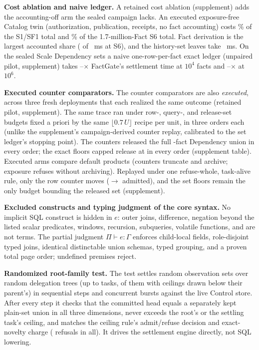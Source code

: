 \documentclass[journal,onecolumn]{IEEEtran}
\newcommand{\code}[1]{\texttt{\detokenize{#1}}}
\begin{document}
\textbf{Cost ablation and naive ledger.} A retained cost
ablation (supplement) adds the accounting-off arm the sealed campaign lacks. An executed exposure-free Catalog
twin (authorization, publication, receipts, no fact accounting) costs
\BFiveSOneCommonPct\% of the S1/SF1 total and \BFiveSSixCommonPct\% of the
1.7-million-Fact S6 total. Fact derivation is the largest accounted share
(\BFiveSSixDerivation{} of \BFiveSSixArmIV{}~ms at S6), and the history-set
leaves take \BFiveSSixLedger{}~ms. On the sealed Scale Dependency sets a naive one-row-per-fact
exact ledger (unpaired pilot, supplement) takes
\NaiveScaleTenKFullRatio{}--\NaiveScaleTenKZeroRatio{}$\times$ FactGate's settlement time at $10^4$
facts and \NaiveScaleMillionFullRatio{}--\NaiveScaleMillionZeroRatio{}$\times$ at $10^6$.

\textbf{Executed counter comparators.} The counter comparators are also \emph{executed}, across three fresh
deployments that each realized the same outcome (retained pilot,
supplement). The same trace ran under row-, query-, and release-set budgets
fixed a priori by the same $\lfloor 0.7\,U\rfloor$ recipe per unit, in
three orders each (unlike the supplement's campaign-derived counter replay,
calibrated to the set ledger's stopping point). The counters
released the full \FinalVFiveCounterNaiveMinDep{}-fact Dependency union in
every order; the exact floors capped release at
\FinalVFiveCounterExactMaxDep{} in every order (supplement table). Executed arms compare default products
(counters truncate and archive; exposure refuses without archiving).
Replayed under one refuse-whole, task-alive rule, only the row counter
moves (\AlignedRowsNaturalExecuted{}$\to$\AlignedRowsNaturalAdmitted{}
admitted), and the set floors remain the only budget bounding the released
set (supplement).

\textbf{Excluded constructs and typing judgment of the core syntax.}
No implicit SQL construct is hidden in $e$: outer joins, difference,
negation beyond the listed scalar predicates, windows, recursion,
subqueries, volatile functions, and \code{UNION ALL} are not terms. The
partial judgment $\Pi\vdash e:\Gamma$ enforces child-local fields,
role-disjoint typed joins, identical distinctable union schemas, typed
grouping, and a proven total page order; undefined premises reject.

\textbf{Randomized root-family test.} The test settles
\VFiveFamilyPropertyQueries{} random observation sets over
\VFiveFamilyPropertySeeds{} random delegation trees (up to
\VFiveFamilyPropertyMaxTasks{} tasks, \VFiveFamilyPropertyNarrowedTasks{}
of them with ceilings drawn below their parent's) in sequential steps and
concurrent bursts against the live Control store. After every step it
checks that the committed head equals a separately kept plain-set union in
all three dimensions, never exceeds the root's or the settling task's
ceiling, and matches the ceiling rule's admit/refuse decision and
exact-novelty charge (\VFiveFamilyPropertyRefused{} refusals in all). It
drives the settlement engine directly, not SQL lowering.
\end{document}
